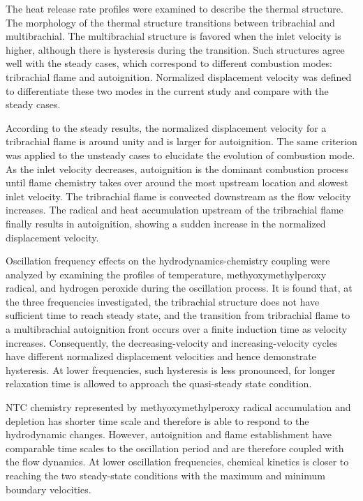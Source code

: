 The heat release rate profiles were examined to describe the thermal structure.  The morphology of the thermal structure transitions between tribrachial and multibrachial.  The multibrachial structure is favored when the inlet velocity is higher, although there is hysteresis during the transition.  Such structures agree well with the steady cases, which correspond to different combustion modes: tribrachial flame and autoignition.  Normalized displacement velocity was defined to differentiate these two modes in the current study and compare with the steady cases.  

According to the steady results, the normalized displacement velocity for a tribrachial flame is around unity and is larger for autoignition.  The same criterion was applied to the unsteady cases to elucidate the evolution of combustion mode.  As the inlet velocity decreases, autoignition is the dominant combustion process until flame chemistry takes over around the most upstream location and slowest inlet velocity.  The tribrachial flame is convected downstream as the flow velocity increases.  The radical and heat accumulation upstream of the tribrachial flame finally results in autoignition, showing a sudden increase in the normalized displacement velocity. 

Oscillation frequency effects on the hydrodynamics-chemistry coupling were analyzed by examining the profiles of temperature, methyoxymethylperoxy radical, and hydrogen peroxide during the oscillation process.  It is found that, at the three frequencies investigated, the tribrachial structure does not have sufficient time to reach steady state, and the transition from tribrachial flame to a multibrachial autoignition front occurs over a finite induction time as velocity increases.  Consequently, the decreasing-velocity and increasing-velocity cycles have different normalized displacement velocities and hence demonstrate hysteresis.  At lower frequencies, such hysteresis is less pronounced, for longer relaxation time is allowed to approach the quasi-steady state condition.

NTC chemistry represented by methyoxymethylperoxy radical accumulation and depletion has shorter time scale and therefore is able to respond to the hydrodynamic changes.  However, autoignition and flame establishment have comparable time scales to the oscillation period and are therefore coupled with the flow dynamics.  At lower oscillation frequencies, chemical kinetics is closer to reaching the two steady-state conditions with the maximum and minimum boundary velocities.

